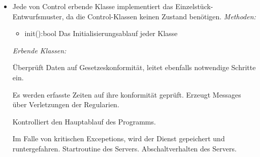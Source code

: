         \begin{itemize}
            \item Jede von Control erbende Klasse implementiert das Einzelstück-Entwurfsmuster, da die Control-Klassen keinen Zustand benötigen.
                \emph{Methoden:}
                \begin{itemize}
                    \item{init():bool}
                        Das Initialisierungsablauf jeder Klasse
                \end{itemize}
                \emph{Erbende Klassen:}
                \begin{itemize}
                       Überprüft Daten auf Gesetzeskonformität, leitet ebenfalls notwendige Schritte ein.
                       \begin{itemize}
                            Es werden erfasste Zeiten auf ihre konformität geprüft.
                            Erzeugt Messages über Verletzungen der Regularien.
                       \end{itemize}

                        Kontrolliert den Hauptablauf des Programms.
                        \begin{itemize}
                                Im Falle von kritischen Excepetions, wird der Dienst gepeichert und runtergefahren.
                                Startroutine des Servers.
                                Abschaltverhalten des Servers.
                        \end{itemize}


\end{itemize}
\end{itemize}

